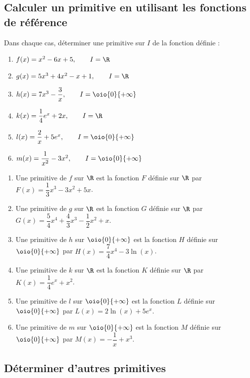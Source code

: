 \documentclass[a4paper,11pt,exos]{nsi} %
\begin{document}
\newpage

\subsection*{Calculer un primitive en utilisant les fonctions de référence}
\exo{}
Dans chaque cas, déterminer une primitive sur $I$ de la fonction définie :
\begin{multicols}{2}
    \begin{enumerate}
        \item $f(x)=x^2-6x+5, \qquad I=\R$
        \item $g(x)=5x^3+4x^2-x+1, \qquad I=\R$
        \item $h(x)=7x^3-\dfrac{3}{x}, \qquad I=\oio{0}{+\infty}$
        \item $k(x)=\dfrac{1}{4}e^x+2x, \qquad I=\R$
        \item $l(x)=\dfrac{2}{x}+5e^x, \qquad I=\oio{0}{+\infty}$
        \item $m(x)=\dfrac{1}{x^2}-3x^2, \qquad I=\oio{0}{+\infty}$
    \end{enumerate}
\end{multicols}

\textcolor{UGLiBlue}{
    \begin{enumerate}
        \item Une primitive de $f$ sur $\R$ est la fonction $F$ définie sur $\R$ par $F(x)=\dfrac{1}{3}x^3-3x^2+5x$.
        \item Une primitive de $g$ sur $\R$ est la fonction $G$ définie sur $\R$ par $G(x)=\dfrac{5}{4}x^4+\dfrac{4}{3}x^3-\dfrac{1}{2}x^2+x$.
        \item Une primitive de $h$ sur $\oio{0}{+\infty}$ est la fonction $H$ définie sur $\oio{0}{+\infty}$ par $H(x)=\dfrac{7}{4}x^4-3\ln(x)$.
        \item Une primitive de $k$ sur $\R$ est la fonction $K$ définie sur $\R$ par $K(x)=\dfrac{1}{4}e^x+x^2$.
        \item Une primitive de $l$ sur $\oio{0}{+\infty}$ est la fonction $L$ définie sur $\oio{0}{+\infty}$ par $L(x)=2\ln(x)+5e^x$.
        \item Une primitive de $m$ sur $\oio{0}{+\infty}$ est la fonction $M$ définie sur $\oio{0}{+\infty}$ par $M(x)=-\dfrac{1}{x}+x^3$.
    \end{enumerate}
}

\subsection*{Déterminer d'autres primitives}
\end{document}
